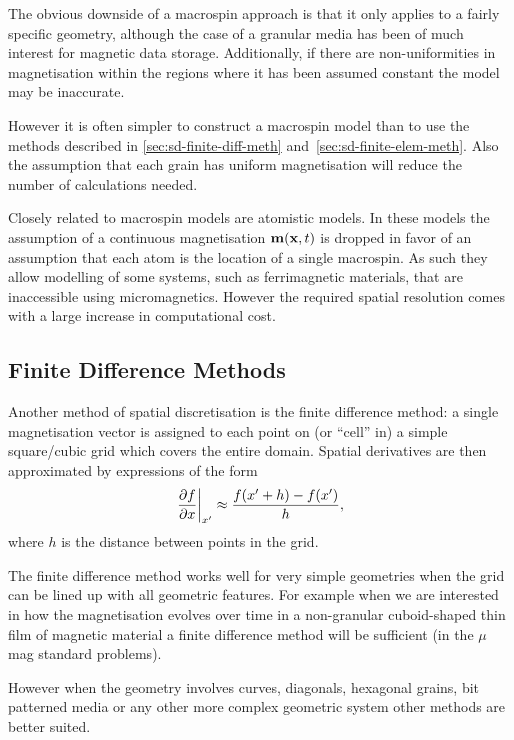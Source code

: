 The obvious downside of a macrospin approach is that it only applies to a fairly specific geometry, although the case of a granular media has been of much interest for magnetic data storage. 
Additionally, if there are non-uniformities in magnetisation within the regions where it has been assumed constant the model may be inaccurate.

However it is often simpler to construct a macrospin model than to use the methods described in \autoref{sec:sd-finite-diff-meth} and~\ref{sec:sd-finite-elem-meth}.
Also the assumption that each grain has uniform magnetisation will reduce the number of calculations needed.

Closely related to macrospin models are atomistic models\cite{Evans2014}.
In these models the assumption of a continuous magnetisation $\mathbf{m}(\mathbf{x}, t)$ is dropped in favor of an assumption that each atom is the location of a single macrospin.
As such they allow modelling of some systems, such as ferrimagnetic materials, that are inaccessible using micromagnetics.
However the required spatial resolution comes with a large increase in computational cost.


\subsection{Finite Difference Methods}
\label{sec:sd-finite-diff-meth}

Another method of spatial discretisation is the finite difference method: a single magnetisation vector is assigned to each point on (or ``cell'' in) a simple square/cubic grid which covers the entire domain.
Spatial derivatives are then approximated by expressions of the form
\begin{equation}
  {\left. {\frac{\partial f}{\partial x}} \right|_{x'}} \approx \frac{f(x' + h) - f(x')}{h},
\end{equation}
where $h$ is the distance between points in the grid.

The finite difference method works well for very simple geometries when the grid can be lined up with all geometric features.
For example when we are interested in how the magnetisation evolves over time in a non-granular cuboid-shaped thin film of magnetic material a finite difference method will be sufficient (\eg in the $\mu$mag standard problems\cite{mumag-website}).

However when the geometry involves curves, diagonals, hexagonal grains, bit patterned media or any other more complex geometric system other methods are better suited.


